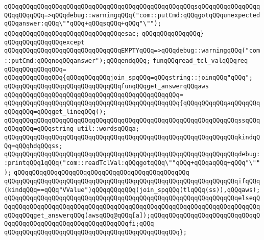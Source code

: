 \verb|qQQqqQQqqQQqqQQqqQQqqQQqqQQqqQQqqQQqqQQqqQQqqQQqqQQqsqQQqqQQqqQQqqQQqqQQqqQQqqQQq=>qQQqdebug::warningqQQq("com::putCmd:qQQqgotqQQqunexpectedqQQqanswer:qQQq\""qQQq+qQQqsqQQq+qQQq"\"");|\newline
\verb|qQQqqQQqqQQqqQQqqQQqqQQqqQQqqQQqesac;|\newline
\verb|qQQqqQQqqQQqqQQq}|\newline
\verb|qQQqqQQqqQQqqQQqexcept|\newline
\verb|qQQqqQQqqQQqqQQqqQQqqQQqqQQqqQQqEMPTYqQQq=>qQQqdebug::warningqQQq("com::putCmd:qQQqnoqQQqanswer");qQQqendqQQq;|\newline
\newline
\newline
\verb|funqQQqread_tcl_valqQQqreq|\newline
\verb|qQQqqQQqqQQqqQQq=|\newline
\verb|qQQqqQQqqQQqqQQq{qQQqqQQqqQQqjoin_spqQQq=qQQqstring::joinqQQq"qQQq";|\newline
\newline
\verb|qQQqqQQqqQQqqQQqqQQqqQQqqQQqqQQqfunqQQqget_answerqQQqaws|\newline
\verb|qQQqqQQqqQQqqQQqqQQqqQQqqQQqqQQqqQQqqQQqqQQqqQQq=|\newline
\verb|qQQqqQQqqQQqqQQqqQQqqQQqqQQqqQQqqQQqqQQqqQQqqQQq{qQQqqQQqqQQqaqQQqqQQqqQQqqQQq=qQQqget_lineqQQq();|\newline
\verb|qQQqqQQqqQQqqQQqqQQqqQQqqQQqqQQqqQQqqQQqqQQqqQQqqQQqqQQqqQQqqQQqssqQQqqQQqqQQq=qQQqstring_util::wordsqQQqa;|\newline
\verb|qQQqqQQqqQQqqQQqqQQqqQQqqQQqqQQqqQQqqQQqqQQqqQQqqQQqqQQqqQQqqQQqkindqQQq=qQQqhdqQQqss;|\newline
\verb|qQQqqQQqqQQqqQQqqQQqqQQqqQQqqQQqqQQqqQQqqQQqqQQqqQQqqQQqqQQqqQQqdebug::printqQQq1qQQq("com::readTclVal:qQQqgotqQQq\""qQQq+qQQqaqQQq+qQQq"\"");|\newline
\verb|qQQqqQQqqQQqqQQqqQQqqQQqqQQqqQQqqQQqqQQqqQQqqQQq|\newline
\verb|qQQqqQQqqQQqqQQqqQQqqQQqqQQqqQQqqQQqqQQqqQQqqQQqqQQqqQQqqQQqqQQqifqQQq(kindqQQq==qQQq"VValue")qQQqqQQqqQQq(join_spqQQq(tlqQQq(ss)),qQQqaws);|\newline
\verb|qQQqqQQqqQQqqQQqqQQqqQQqqQQqqQQqqQQqqQQqqQQqqQQqqQQqqQQqqQQqqQQqelseqQQqqQQqqQQqqQQqqQQqqQQqqQQqqQQqqQQqqQQqqQQqqQQqqQQqqQQqqQQqqQQqqQQqqQQqqQQqqQQqget_answerqQQq(awsqQQq@qQQq[a]);qQQqqQQqqQQqqQQqqQQqqQQqqQQqqQQqqQQqqQQqqQQqqQQqqQQqqQQqqQQqqQQqfi;qQQq|\newline
\verb|qQQqqQQqqQQqqQQqqQQqqQQqqQQqqQQqqQQqqQQqqQQqqQQq};|\newline
